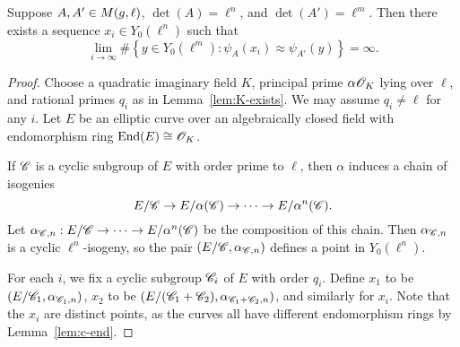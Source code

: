 \documentclass{amsart}
\begin{document}
\begin{lemma}\label{lem:lim-degree}
  Suppose $A,A' \in M(g,\ell)$, $\det(A) = \ell^n$, and $\det(A') = \ell^m$.
  Then there exists a sequence $x_i \in Y_0(\ell^n)$ such that
  \[
    \lim_{i \to \infty}\#\left\{ y \in Y_0(\ell^m) \colon \psi_A(x_i) \approx \psi_{A'}(y) \right\} = \infty.
  \]
\end{lemma}
\begin{proof}
  Choose a quadratic imaginary field $K$, principal prime $\alpha\mathscr{O}_K$ lying over $\ell$, and rational primes $q_i$ as in Lemma~\ref{lem:K-exists}. We may assume $q_i \neq \ell$ for any $i$. Let $E$ be an elliptic curve over an algebraically closed field with endomorphism ring $\operatorname{End}(E) \cong \mathscr{O}_K$.

  If $\mathscr{C}$ is a cyclic subgroup of $E$ with order prime to $\ell$, then $\alpha$ induces a chain of isogenies
  \[
    E/\mathscr{C} \to E/\alpha(\mathscr{C}) \to \cdots \to E/\alpha^n(\mathscr{C}).
  \]
  Let $\alpha_{\mathscr{C},n}: E/\mathscr{C} \to \cdots \to E/\alpha^n(\mathscr{C})$ be the composition of this chain. Then $\alpha_{\mathscr{C},n}$ is a cyclic $\ell^n$-isogeny, so the pair $(E/\mathscr{C},\alpha_{\mathscr{C},n})$ defines a point in $Y_0(\ell^n)$.

    For each $i$, we fix a cyclic subgroup $\mathscr{C}_i$ of $E$ with order $q_i$. Define $x_1$ to be $(E/\mathscr{C}_1,\alpha_{\mathscr{C}_1,n})$, $x_2$ to be $(E/(\mathscr{C}_1 + \mathscr{C}_2), \alpha_{\mathscr{C}_1 + \mathscr{C}_2,n})$, and similarly for $x_i$. Note that the $x_i$ are distinct points, as the curves all have different endomorphism rings by Lemma~\ref{lem:c-end}.


\end{proof}
\end{document}
